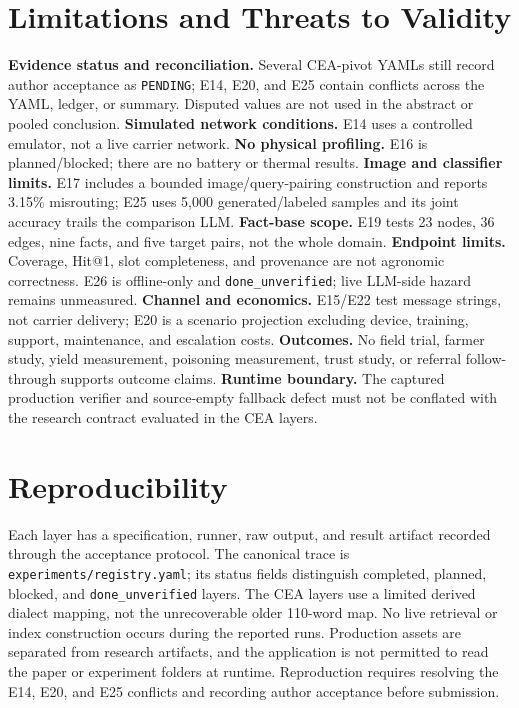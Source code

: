 \documentclass[11pt,a4paper]{article}
\begin{document}
\section{Limitations and Threats to Validity}
\label{sec:limitations}

\textbf{Evidence status and reconciliation.} Several CEA-pivot YAMLs still record author acceptance as \texttt{PENDING}; E14, E20, and E25 contain conflicts across the YAML, ledger, or summary. Disputed values are not used in the abstract or pooled conclusion. \textbf{Simulated network conditions.} E14 uses a controlled emulator, not a live carrier network. \textbf{No physical profiling.} E16 is planned/blocked; there are no battery or thermal results. \textbf{Image and classifier limits.} E17 includes a bounded image/query-pairing construction and reports 3.15\% misrouting; E25 uses 5,000 generated/labeled samples and its joint accuracy trails the comparison LLM. \textbf{Fact-base scope.} E19 tests 23 nodes, 36 edges, nine facts, and five target pairs, not the whole domain. \textbf{Endpoint limits.} Coverage, Hit@1, slot completeness, and provenance are not agronomic correctness. E26 is offline-only and \texttt{done\_unverified}; live LLM-side hazard remains unmeasured. \textbf{Channel and economics.} E15/E22 test message strings, not carrier delivery; E20 is a scenario projection excluding device, training, support, maintenance, and escalation costs. \textbf{Outcomes.} No field trial, farmer study, yield measurement, poisoning measurement, trust study, or referral follow-through supports outcome claims. \textbf{Runtime boundary.} The captured production verifier and source-empty fallback defect must not be conflated with the research contract evaluated in the CEA layers.

\section{Reproducibility}
\label{sec:reproducibility}

Each layer has a specification, runner, raw output, and result artifact recorded through the acceptance protocol. The canonical trace is \texttt{experiments/registry.yaml}; its status fields distinguish completed, planned, blocked, and \texttt{done\_unverified} layers. The CEA layers use a limited derived dialect mapping, not the unrecoverable older 110-word map. No live retrieval or index construction occurs during the reported runs. Production assets are separated from research artifacts, and the application is not permitted to read the paper or experiment folders at runtime. Reproduction requires resolving the E14, E20, and E25 conflicts and recording author acceptance before submission.
\end{document}
